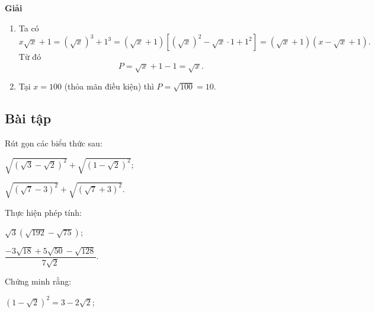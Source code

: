 \begin{exercises}
    \textbf{Giải}

    \begin{enumerate}[label=\alph*)]
        \item Ta có
        \[
            x\sqrt{x}+1=(\sqrt{x})^3+1^3=(\sqrt{x}+1)\left[(\sqrt{x})^2-\sqrt{x}\cdot 1+1^2\right]
            =(\sqrt{x}+1)(x-\sqrt{x}+1).
        \]
        Từ đó
        \[
            P=\sqrt{x}+1-1=\sqrt{x}.
        \]
        \item Tại $x=100$ (thỏa mãn điều kiện) thì $P=\sqrt{100}=10$.
    \end{enumerate}

    \subsection{Bài tập}

    \begin{questions}[resume=SGK]
        \item Rút gọn các biểu thức sau:
        \begin{questions}
            \item $\sqrt{(\sqrt{3}-\sqrt{2})^2}+\sqrt{(1-\sqrt{2})^2}$;

            \answerline
            \answerline

            \item $\sqrt{(\sqrt{7}-3)^2}+\sqrt{(\sqrt{7}+3)^2}$.

            \answerline
            \answerline
        \end{questions}

        \item Thực hiện phép tính:
        \begin{questions}
            \item $\sqrt{3}\left(\sqrt{192}-\sqrt{75}\right)$;

            \answerline
            \answerline

            \item $\dfrac{-3\sqrt{18}+5\sqrt{50}-\sqrt{128}}{7\sqrt{2}}$.

            \answerline
            \answerline
        \end{questions}

        \item Chứng minh rằng:
        \begin{questions}
            \item $(1-\sqrt{2})^2=3-2\sqrt{2}$;

            \answerline
            \answerline


\end{questions}
\end{questions}
\end{exercises}
